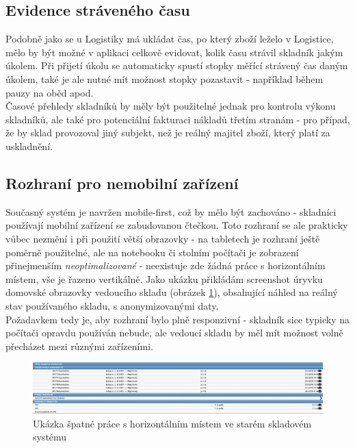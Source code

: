 \subsection{Evidence stráveného času}

Podobně jako se u Logistiky má ukládat čas, po který zboží leželo v Logistice, mělo by být možné v aplikaci celkově evidovat, kolik času strávil skladník jakým úkolem. Při přijetí úkolu se automaticky spustí stopky měřící strávený čas daným úkolem, také je ale nutné mít možnost stopky pozastavit - například během pauzy na oběd apod.\\
Časové přehledy skladníků by měly být použitelné jednak pro kontrolu výkonu skladníků, ale také pro potenciální fakturaci nákladů třetím stranám - pro případ, že by sklad provozoval jiný subjekt, než je reálný majitel zboží, který platí za uskladnění.

\subsection{Rozhraní pro nemobilní zařízení}

Současný systém je navržen mobile-first, což by mělo být zachováno - skladníci používají mobilní zařízení se zabudovanou čtečkou. Toto rozhraní se ale prakticky vůbec nezmění i při použití větší obrazovky - na tabletech je rozhraní ještě poměrně použitelné, ale na notebooku či stolním počítači je zobrazení přinejmenším \emph{neoptimalizované} - neexistuje zde žádná práce s horizontálním místem, vše je řazeno vertikálně. Jako ukázku přikládám screenshot úryvku domovské obrazovky vedoucího skladu (obrázek \ref{picture:sysel:vertical}), obsahující náhled na reálný stav používaného skladu, s anonymizovanými daty.\\
Požadavkem tedy je, aby rozhraní bylo plně responzivní - skladník sice typicky na počítači opravdu používán nebude, ale vedoucí skladu by měl mít možnost volně přecházet mezi různými zařízeními.

\begin{figure}[]
\includegraphics[width=\textwidth]{../png/sysel/vertical.png}
\caption{Ukázka špatné práce s horizontálním místem ve starém skladovém systému} \label{picture:sysel:vertical}
\end{figure}

